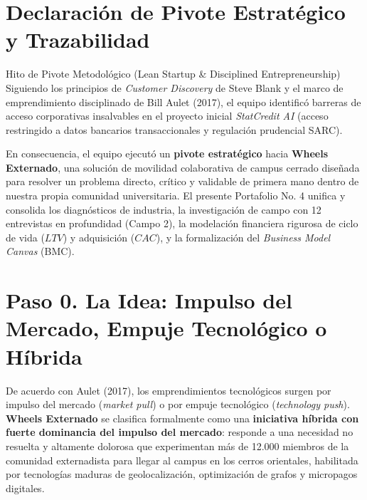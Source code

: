 \documentclass[11pt,a4paper]{article}
\begin{document}
\section*{Declaraci\'on de Pivote Estrat\'egico y Trazabilidad}

\begin{externadobox}{Hito de Pivote Metodol\'ogico (Lean Startup \& Disciplined Entrepreneurship)}
Siguiendo los principios de \textit{Customer Discovery} de Steve Blank y el marco de emprendimiento disciplinado de Bill Aulet (2017), el equipo identific\'o barreras de acceso corporativas insalvables en el proyecto inicial \textit{StatCredit AI} (acceso restringido a datos bancarios transaccionales y regulaci\'on prudencial SARC). 

En consecuencia, el equipo ejecut\'o un \textbf{pivote estrat\'egico} hacia \textbf{Wheels Externado}, una soluci\'on de movilidad colaborativa de campus cerrado dise\~nada para resolver un problema directo, cr\'itico y validable de primera mano dentro de nuestra propia comunidad universitaria. El presente Portafolio No. 4 unifica y consolida los diagn\'osticos de industria, la investigaci\'on de campo con 12 entrevistas en profundidad (Campo 2), la modelaci\'on financiera rigurosa de ciclo de vida ($LTV$) y adquisici\'on ($CAC$), y la formalizaci\'on del \textit{Business Model Canvas} (BMC).
\end{externadobox}

\vspace{0.3cm}

\section{Paso 0. La Idea: Impulso del Mercado, Empuje Tecnol\'ogico o H\'ibrida}

De acuerdo con Aulet (2017), los emprendimientos tecnol\'ogicos surgen por impulso del mercado (\textit{market pull}) o por empuje tecnol\'ogico (\textit{technology push}). \textbf{Wheels Externado} se clasifica formalmente como una \textbf{iniciativa h\'ibrida con fuerte dominancia del impulso del mercado}: responde a una necesidad no resuelta y altamente dolorosa que experimentan m\'as de 12.000 miembros de la comunidad externadista para llegar al campus en los cerros orientales, habilitada por tecnolog\'ias maduras de geolocalizaci\'on, optimizaci\'on de grafos y micropagos digitales.
\end{document}
